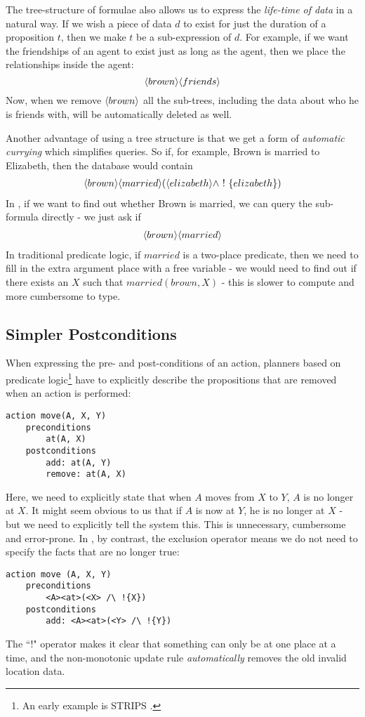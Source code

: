The tree-structure of formulae also allows us to express the \emph{life-time of data} in a natural way. 
If we wish a piece of data $d$ to exist for just the duration of a proposition $t$, then we make $t$ be a sub-expression of $d$. 
For example, if we want the friendships of an agent to exist just as long as the agent, then we place the relationships inside the agent: 
\[
\langle brown \rangle \langle friends \rangle \]
Now, when we remove $\MAY{brown}$ all the sub-trees, including the data about who he is friends with, will be automatically deleted as well.

Another advantage of using a tree structure is that we get a form of \emph{automatic currying} which simplifies queries.
So if, for example, Brown is married to Elizabeth, then the database would contain 
\begin{eqnarray*}
\langle brown \rangle \langle married \rangle (\langle elizabeth \rangle \land \ ! \  \{elizabeth\})
\end{eqnarray*}
In \ELFULL{}, if we want to find out whether Brown is married, we can query the sub-formula directly -  we just ask if 
\begin{eqnarray*}
\langle brown \rangle \langle married \rangle \end{eqnarray*}
In traditional predicate logic, if $married$ is a two-place predicate, then we need to fill in the extra argument place with a free variable - we would need to find out if there exists an $X$ such that $married(brown, X)$ - this is slower to compute and more cumbersome to type. 

\subsection{Simpler Postconditions}
When expressing the pre- and post-conditions of an action, planners based on predicate logic\footnote{An early example is STRIPS \cite{strips}.} have to explicitly describe the propositions that are removed when an action is performed:
\begin{verbatim}
action move(A, X, Y)
    preconditions
        at(A, X)
    postconditions
        add: at(A, Y) 
        remove: at(A, X)
\end{verbatim}
Here, we need to explicitly state that when $A$ moves from $X$ to $Y$, $A$ is no longer at $X$. It might seem obvious to us that if $A$ is now at $Y$, he is no longer at $X$ - but we need to explicitly tell the system this. This is unnecessary, cumbersome and error-prone. In \ELFULL{}, by contrast, the exclusion operator means we do not need to specify the facts that are no longer true:
\begin{verbatim}
action move (A, X, Y)
    preconditions
        <A><at>(<X> /\ !{X})
    postconditions
        add: <A><at>(<Y> /\ !{Y})
\end{verbatim}
The ``!" operator makes it clear that something can only be at one place at a time, and the non-monotonic update rule \emph{automatically} removes the old invalid location data.

